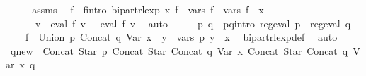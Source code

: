 \begin{isabellebody}
%
\isatagproof
{}\isamarkupfalse%
\ {\isacharminus}{\kern0pt}\isanewline
\ \ \isamarkupfalse%
\ assms\ \isamarkupfalse%
\ f{\isacharprime}{\kern0pt}\ \ f{\isacharprime}{\kern0pt}{\isacharunderscore}{\kern0pt}intro{\isacharcolon}{\kern0pt}\ {\isachardoublequoteopen}bipart{\isacharunderscore}{\kern0pt}rlexp\ x\ f{\isacharprime}{\kern0pt}\ {\isasymand}\ vars\ f{\isacharprime}{\kern0pt}\ {\isacharequal}{\kern0pt}\ vars\ f\ {\isasymunion}\ {\isacharbraceleft}{\kern0pt}x{\isacharbraceright}{\kern0pt}\ {\isasymand}\isanewline
\ \ \ \ \ \ {\isacharparenleft}{\kern0pt}{\isasymforall}v{\isachardot}{\kern0pt}\ {\isasymPsi}\ {\isacharparenleft}{\kern0pt}eval\ f\ v{\isacharparenright}{\kern0pt}\ {\isacharequal}{\kern0pt}\ {\isasymPsi}\ {\isacharparenleft}{\kern0pt}eval\ f{\isacharprime}{\kern0pt}\ v{\isacharparenright}{\kern0pt}{\isacharparenright}{\kern0pt}{\isachardoublequoteclose}\ \isamarkupfalse%
\ auto\isanewline
\ \ \isamarkupfalse%
\ \isamarkupfalse%
\ p\ q\ \ p{\isacharunderscore}{\kern0pt}q{\isacharunderscore}{\kern0pt}intro{\isacharcolon}{\kern0pt}\ {\isachardoublequoteopen}reg{\isacharunderscore}{\kern0pt}eval\ p\ {\isasymand}\ reg{\isacharunderscore}{\kern0pt}eval\ q\ {\isasymand}\isanewline
\ \ \ \ f{\isacharprime}{\kern0pt}\ {\isacharequal}{\kern0pt}\ Union\ p\ {\isacharparenleft}{\kern0pt}Concat\ q\ {\isacharparenleft}{\kern0pt}Var\ x{\isacharparenright}{\kern0pt}{\isacharparenright}{\kern0pt}\ {\isasymand}\ {\isacharparenleft}{\kern0pt}{\isasymforall}y\ {\isasymin}\ vars\ p{\isachardot}{\kern0pt}\ y\ {\isasymnoteq}\ x{\isacharparenright}{\kern0pt}{\isachardoublequoteclose}\ \isamarkupfalse%
\ bipart{\isacharunderscore}{\kern0pt}rlexp{\isacharunderscore}{\kern0pt}def\ \isamarkupfalse%
\ auto\isanewline
\ \ \isamarkupfalse%
\ {\isacharquery}{\kern0pt}q{\isacharunderscore}{\kern0pt}new\ {\isacharequal}{\kern0pt}\ {\isachardoublequoteopen}Concat\ {\isacharparenleft}{\kern0pt}Star\ p{\isacharparenright}{\kern0pt}\ {\isacharparenleft}{\kern0pt}Concat\ {\isacharparenleft}{\kern0pt}Star\ {\isacharparenleft}{\kern0pt}Concat\ q\ {\isacharparenleft}{\kern0pt}Var\ x{\isacharparenright}{\kern0pt}{\isacharparenright}{\kern0pt}{\isacharparenright}{\kern0pt}\ {\isacharparenleft}{\kern0pt}Concat\ {\isacharparenleft}{\kern0pt}Star\ {\isacharparenleft}{\kern0pt}Concat\ q\ {\isacharparenleft}{\kern0pt}Var\ x{\isacharparenright}{\kern0pt}{\isacharparenright}{\kern0pt}{\isacharparenright}{\kern0pt}\ q{\isacharparenright}{\kern0pt}{\isacharparenright}{\kern0pt}{\isachardoublequoteclose}\isanewline

\end{isabellebody}
